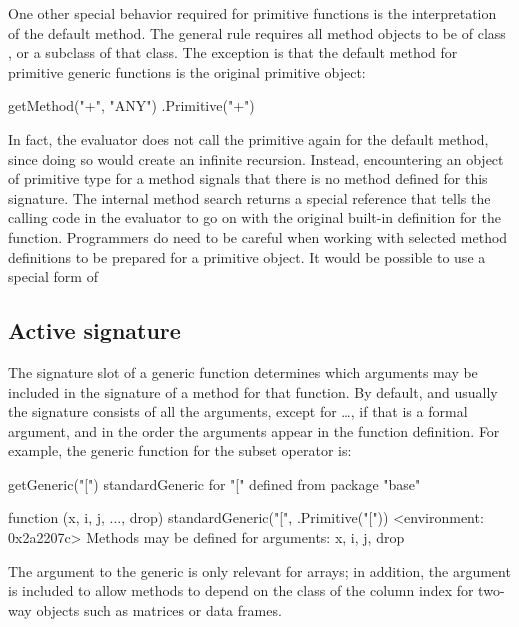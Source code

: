 \documentclass[11pt]{article}
\begin{document}
One other special behavior required for primitive functions is the interpretation of the default method.
The general rule requires all method objects to be of class , or a subclass of that class.
The exception is that the default method for primitive generic functions is the original primitive object:
\begin{Example}
\SPrompt{}getMethod("+", "ANY")
.Primitive("+")
\end{Example}
In fact, the evaluator does not call the primitive again for the default method, since doing so would create an infinite recursion.
Instead, encountering an object of primitive type for a method signals that there is no method defined for this signature.
The internal method search returns a special reference that tells the calling code in the evaluator to go on with the original built-in definition for the function.
Programmers do need to be careful when working with selected method definitions to be prepared for a primitive object.
It would be possible to use a special form of 

\subsection*{Active signature}
\label{sec:active-signature}

The signature slot of a generic function determines which arguments may be included in the signature of a method for that function.
By default, and usually the signature consists of all the arguments, except for \dots{}, if that is a formal argument, and in the order the arguments appear in the function definition.
For example, the generic function for the subset operator is:
\begin{Example}
\SPrompt{}getGeneric("[")
standardGeneric for "[" defined from package "base"

function (x, i, j, ..., drop) 
standardGeneric("[", .Primitive("["))
<environment: 0x2a2207c>
Methods may be defined for arguments: x, i, j, drop 
\end{Example}
The argument  to the generic is only relevant for arrays; in addition, the argument  is included to allow methods to depend on the class of the column index for two-way objects such as matrices or data frames.
\end{document}
